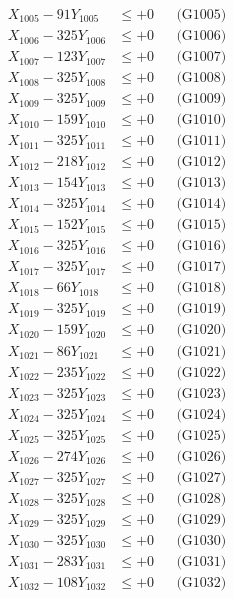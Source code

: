 \documentclass[a4paper,10pt]{article}
\begin{document}
{\begin{align}
X_{1005} - 91Y_{1005} &\leq +0 && \text{(G1005)} \\
X_{1006} - 325Y_{1006} &\leq +0 && \text{(G1006)} \\
X_{1007} - 123Y_{1007} &\leq +0 && \text{(G1007)} \\
X_{1008} - 325Y_{1008} &\leq +0 && \text{(G1008)} \\
X_{1009} - 325Y_{1009} &\leq +0 && \text{(G1009)} \\
X_{1010} - 159Y_{1010} &\leq +0 && \text{(G1010)} \\
\allowbreak
X_{1011} - 325Y_{1011} &\leq +0 && \text{(G1011)} \\
X_{1012} - 218Y_{1012} &\leq +0 && \text{(G1012)} \\
X_{1013} - 154Y_{1013} &\leq +0 && \text{(G1013)} \\
X_{1014} - 325Y_{1014} &\leq +0 && \text{(G1014)} \\
X_{1015} - 152Y_{1015} &\leq +0 && \text{(G1015)} \\
X_{1016} - 325Y_{1016} &\leq +0 && \text{(G1016)} \\
X_{1017} - 325Y_{1017} &\leq +0 && \text{(G1017)} \\
X_{1018} - 66Y_{1018} &\leq +0 && \text{(G1018)} \\
X_{1019} - 325Y_{1019} &\leq +0 && \text{(G1019)} \\
X_{1020} - 159Y_{1020} &\leq +0 && \text{(G1020)} \\
\allowbreak
X_{1021} - 86Y_{1021} &\leq +0 && \text{(G1021)} \\
X_{1022} - 235Y_{1022} &\leq +0 && \text{(G1022)} \\
X_{1023} - 325Y_{1023} &\leq +0 && \text{(G1023)} \\
X_{1024} - 325Y_{1024} &\leq +0 && \text{(G1024)} \\
X_{1025} - 325Y_{1025} &\leq +0 && \text{(G1025)} \\
X_{1026} - 274Y_{1026} &\leq +0 && \text{(G1026)} \\
X_{1027} - 325Y_{1027} &\leq +0 && \text{(G1027)} \\
X_{1028} - 325Y_{1028} &\leq +0 && \text{(G1028)} \\
X_{1029} - 325Y_{1029} &\leq +0 && \text{(G1029)} \\
X_{1030} - 325Y_{1030} &\leq +0 && \text{(G1030)} \\
\allowbreak
X_{1031} - 283Y_{1031} &\leq +0 && \text{(G1031)} \\
X_{1032} - 108Y_{1032} &\leq +0 && \text{(G1032)} \\

\end{align}}
\end{document}
